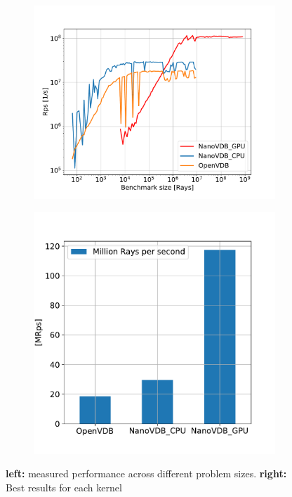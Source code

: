 \begin{figure}[h]
    \begin{subfigure}{0.5\textwidth}
        \includegraphics[width=1\linewidth]{res/results.pdf}

    \end{subfigure}
    \begin{subfigure}{0.4\textwidth}
        \includegraphics[width=1\linewidth]{res/barplot.pdf}
    \end{subfigure}

    \caption{\textbf{left:} measured performance across different problem sizes. \textbf{right:} Best results for each kernel}
    \label{fig:results}
\end{figure}

